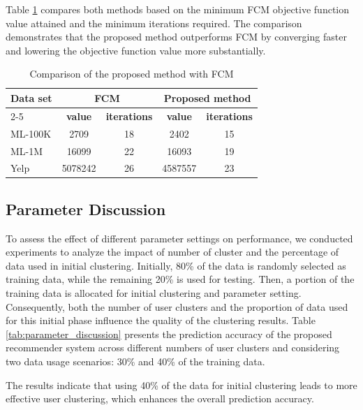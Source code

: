 \documentclass{article}
\begin{document}
Table \ref{tab:cmpFCM} compares both methods based on the minimum FCM objective function value attained and the minimum iterations required. The comparison demonstrates that the proposed method outperforms FCM by converging faster and lowering the objective function value more substantially.

\begin{table}[htbp]
\centering
\caption{Comparison of the proposed method with FCM}
\label{tab:cmpFCM}
\renewcommand{\arraystretch}{1.3}
\setlength{\tabcolsep}{8pt}
\begin{tabular}{lcccc}
\hline
\textbf{Data set} & \multicolumn{2}{c}{\textbf{FCM}} & \multicolumn{2}{c}{\textbf{Proposed method}} \\
\cline{2-5}
& \textbf{value} & \textbf{iterations} & \textbf{value} & \textbf{iterations} \\
\hline
ML-100K & 2709 & 18 & 2402 & 15 \\
ML-1M   & 16099 & 22 & 16093 & 19 \\
Yelp    & 5078242 & 26 & 4587557 & 23 \\
\hline
\end{tabular}
\end{table}



\subsection{Parameter Discussion}
To assess the effect of different parameter settings on performance, we conducted experiments to analyze the impact of number of cluster and the percentage of data used in initial clustering. 
Initially, 80\% of the data is randomly selected as training data, while the remaining 20\% is used for testing.
Then, a portion of the training data is allocated for initial clustering and parameter setting. Consequently, both the number of user clusters and the proportion of data used for this initial phase influence the quality of the clustering results.
Table \ref{tab:parameter_discussion} presents the prediction accuracy of the proposed recommender system across different numbers of user clusters and considering two data usage scenarios: 30\% and 40\% of the training data.

The results indicate that using 40\% of the data for initial clustering leads to more effective user clustering, which enhances the overall prediction accuracy.
\end{document}
